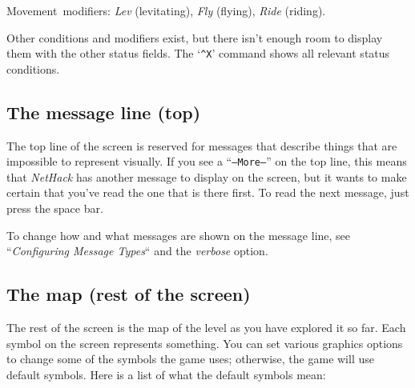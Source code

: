 Movement~modifiers:
{\it Lev\/} (levitating), {\it Fly\/} (flying), {\it Ride\/} (riding).

Other conditions and modifiers exist, but there isn't enough room to
display them with the other status fields.  The `{\tt \^{}X}' command shows
all relevant status conditions.
\elist

\subsection*{The message line (top)}

The top line of the screen is reserved for messages that describe
things that are impossible to represent visually.  If you see a
``{\tt --More--}'' on the top line, this means that {\it NetHack\/} has
another message to display on the screen, but it wants to make certain
that you've read the one that is there first.  To read the next message,
just press the space bar.

To change how and what messages are shown on the message line,
see ``{\it Configuring Message Types\/}`` and the {\it verbose\/}
option.

\subsection*{The map (rest of the screen)}

The rest of the screen is the map of the level as you have explored it
so far.  Each symbol on the screen represents something.  You can set
various graphics
options to change some of the symbols the game uses; otherwise, the
game will use default symbols.  Here is a list of what the default
symbols mean:

